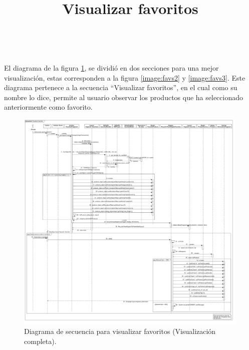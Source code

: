 \title{\textbf{Visualizar favoritos}}
\\ \par
El diagrama de la figura \ref{image:favs1}, se dividió en dos secciones para una mejor visualización, estas corresponden a la figura \ref{image:favs2} y \ref{image:favs3}. Este diagrama pertenece a la secuencia ``Visualizar favoritos'', en el cual como su nombre lo dice, permite al usuario observar los productos que ha seleccionado anteriormente como favorito.
\FloatBarrier
\begin{figure}[htbp!]
		\centering
			\includegraphics[width=1.1 \textwidth]{imagenes/Diagramas_UserApp/Nuevos_diagramas/Favoritos}
		\caption{Diagrama de secuencia para visualizar favoritos (Visualización completa).}
		\label{image:favs1}
\end{figure}
\FloatBarrier

